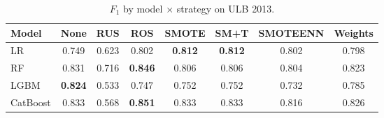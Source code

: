 \begin{table}[ht!]
\centering
\caption{$F_1$ by model $\times$ strategy on ULB 2013.}
\label{tab:factorial_ulb_f1}
\begin{tabular}{l c c c c c c c}
\toprule
Model & None & RUS & ROS & SMOTE & SM+T & SMOTEENN & Weights \\
\midrule
LR         & 0.749 & 0.623 & 0.802 & \textbf{0.812} & \textbf{0.812} & 0.802 & 0.798 \\
RF         & 0.831 & 0.716 & \textbf{0.846} & 0.806 & 0.806 & 0.804 & 0.823 \\
LGBM       & \textbf{0.824} & 0.533 & 0.747 & 0.752 & 0.752 & 0.732 & 0.785 \\
CatBoost   & 0.833 & 0.568 & \textbf{0.851} & 0.833 & 0.833 & 0.816 & 0.826 \\
\bottomrule
\end{tabular}
\end{table}